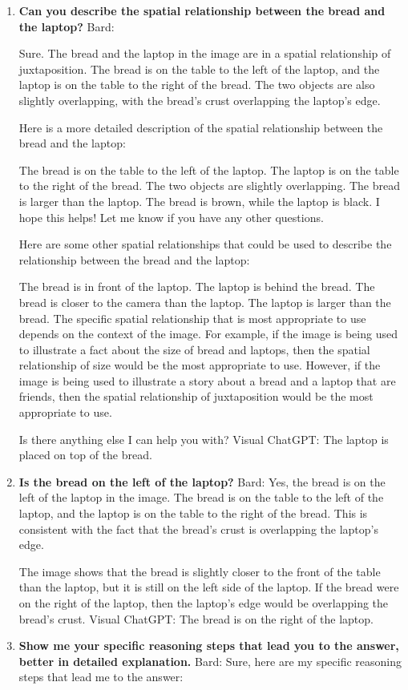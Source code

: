     \begin{enumerate}
        \item \textbf{Can you describe the spatial relationship between the bread and the laptop?}
        \subitem Bard:
        
        Sure. The bread and the laptop in the image are in a spatial relationship of juxtaposition. The bread is on the table to the left of the laptop, and the laptop is on the table to the right of the bread. The two objects are also slightly overlapping, with the bread's crust overlapping the laptop's edge.

        Here is a more detailed description of the spatial relationship between the bread and the laptop:

        The bread is on the table to the left of the laptop.
        The laptop is on the table to the right of the bread.
        The two objects are slightly overlapping.
        The bread is larger than the laptop.
        The bread is brown, while the laptop is black.
        I hope this helps! Let me know if you have any other questions.

        Here are some other spatial relationships that could be used to describe the relationship between the bread and the laptop:

        The bread is in front of the laptop.
        The laptop is behind the bread.
        The bread is closer to the camera than the laptop.
        The laptop is larger than the bread.
        The specific spatial relationship that is most appropriate to use depends on the context of the image. For example, if the image is being used to illustrate a fact about the size of bread and laptops, then the spatial relationship of size would be the most appropriate to use. However, if the image is being used to illustrate a story about a bread and a laptop that are friends, then the spatial relationship of juxtaposition would be the most appropriate to use.

        Is there anything else I can help you with?
        \subitem Visual ChatGPT: The laptop is placed on top of the bread.
        \item \textbf{Is the bread on the left of the laptop?}
        \subitem Bard: Yes, the bread is on the left of the laptop in the image. The bread is on the table to the left of the laptop, and the laptop is on the table to the right of the bread. This is consistent with the fact that the bread's crust is overlapping the laptop's edge.

        The image shows that the bread is slightly closer to the front of the table than the laptop, but it is still on the left side of the laptop. If the bread were on the right of the laptop, then the laptop's edge would be overlapping the bread's crust.
        \subitem Visual ChatGPT: The bread is on the right of the laptop.
        \item \textbf{Show me your specific reasoning steps that lead you to the answer, better in detailed explanation.}
        \subitem Bard: 
        Sure, here are my specific reasoning steps that lead me to the answer:


\end{enumerate}
